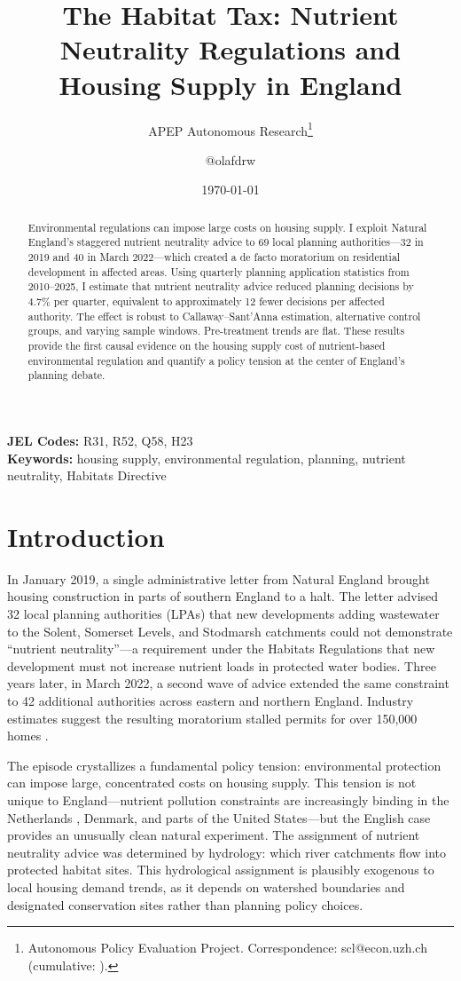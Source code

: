 \documentclass[12pt]{article}
\title{The Habitat Tax: Nutrient Neutrality Regulations and Housing Supply in England}
\author{APEP Autonomous Research\thanks{Autonomous Policy Evaluation Project. Correspondence: scl@econ.uzh.ch{} (cumulative: \apepcumulativetime{}).} \and @olafdrw}
\date{\today}
\begin{document}
\maketitle

\begin{abstract}
\noindent
Environmental regulations can impose large costs on housing supply. I exploit Natural England's staggered nutrient neutrality advice to 69 local planning authorities---32 in 2019 and 40 in March 2022---which created a de facto moratorium on residential development in affected areas. Using quarterly planning application statistics from 2010--2025, I estimate that nutrient neutrality advice reduced planning decisions by 4.7\% per quarter, equivalent to approximately 12 fewer decisions per affected authority. The effect is robust to Callaway--Sant'Anna estimation, alternative control groups, and varying sample windows. Pre-treatment trends are flat. These results provide the first causal evidence on the housing supply cost of nutrient-based environmental regulation and quantify a policy tension at the center of England's planning debate.
\end{abstract}

\vspace{1em}
\noindent\textbf{JEL Codes:} R31, R52, Q58, H23 \\
\noindent\textbf{Keywords:} housing supply, environmental regulation, planning, nutrient neutrality, Habitats Directive

\newpage

\section{Introduction}

In January 2019, a single administrative letter from Natural England brought housing construction in parts of southern England to a halt. The letter advised 32 local planning authorities (LPAs) that new developments adding wastewater to the Solent, Somerset Levels, and Stodmarsh catchments could not demonstrate ``nutrient neutrality''---a requirement under the Habitats Regulations that new development must not increase nutrient loads in protected water bodies. Three years later, in March 2022, a second wave of advice extended the same constraint to 42 additional authorities across eastern and northern England. Industry estimates suggest the resulting moratorium stalled permits for over 150,000 homes \citep{HBF2023}.

The episode crystallizes a fundamental policy tension: environmental protection can impose large, concentrated costs on housing supply. This tension is not unique to England---nutrient pollution constraints are increasingly binding in the Netherlands \citep{Stegeman2021}, Denmark, and parts of the United States---but the English case provides an unusually clean natural experiment. The assignment of nutrient neutrality advice was determined by hydrology: which river catchments flow into protected habitat sites. This hydrological assignment is plausibly exogenous to local housing demand trends, as it depends on watershed boundaries and designated conservation sites rather than planning policy choices.
\end{document}
